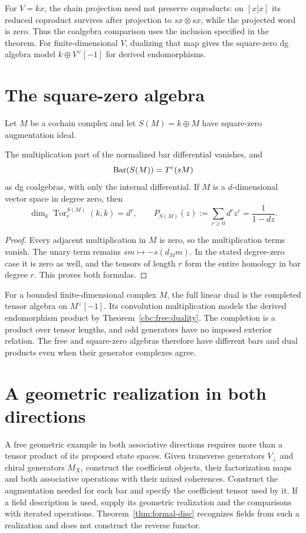 For $V=kx$, the chain projection need not preserve coproducts: on $[x|x]$ its reduced coproduct survives after projection to $sx\otimes sx$, while the projected word is zero.
Thus the coalgebra comparison uses the inclusion specified in the theorem.
For finite-dimensional $V$, dualizing that map gives the square-zero dg algebra model $k\oplus V^\vee[-1]$ for derived endomorphisms.

\section{The square-zero algebra}
Let $M$ be a cochain complex and let $S(M)=k\oplus M$ have square-zero augmentation ideal.

\begin{proposition}\label{prop:square-zero}
The multiplication part of the normalized bar differential vanishes, and
\[
 \operatorname{Bar}(S(M))=T^c(sM)
\]
as dg coalgebras, with only the internal differential.
If $M$ is a $d$-dimensional vector space in degree zero, then
\[
 \dim_k\operatorname{Tor}^{S(M)}_r(k,k)=d^r,\qquad
 P_{S(M)}(z):=\sum_{r\ge0}d^rz^r=\frac1{1-dz}.
\]
\end{proposition}
\begin{proof}
Every adjacent multiplication in $M$ is zero, so the multiplication terms vanish.
The unary term remains $sm\mapsto-s(d_Mm)$.
In the stated degree-zero case it is zero as well, and the tensors of length $r$ form the entire homology in bar degree $r$.
This proves both formulas.
\end{proof}

For a bounded finite-dimensional complex $M$, the full linear dual is the completed tensor algebra on $M^\vee[-1]$.
Its convolution multiplication models the derived endomorphism product by Theorem~\ref{cbc:free:duality}.
The completion is a product over tensor lengths, and odd generators have no imposed exterior relation.
The free and square-zero algebras therefore have different bars and dual products even when their generator complexes agree.

\section{A geometric realization in both directions}
A free geometric example in both associative directions requires more than a tensor product of its proposed state spaces.
Given transverse generators $V_\perp$ and chiral generators $M_X$, construct the coefficient objects, their factorization maps and both associative operations with their mixed coherences.
Construct the augmentation needed for each bar and specify the coefficient tensor used by it.
If a field description is used, supply its geometric realization and the comparisons with iterated operations.
Theorem~\ref{thm:formal-disc} recognizes fields from such a realization and does not construct the reverse functor.

